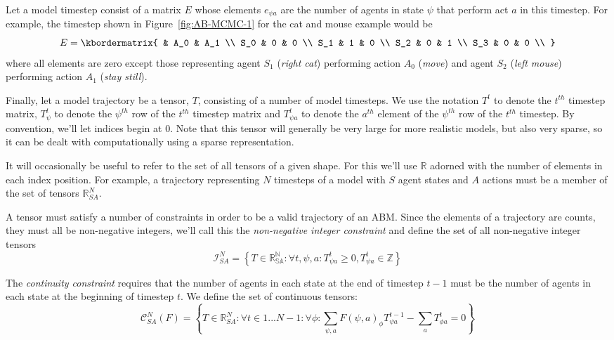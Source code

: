 \documentclass{article}
\begin{document}
Let a model timestep consist of a matrix $E$ whose elements $e_{\psi a}$ are the number of agents in state $\psi$ that perform act $a$ in this timestep. For example, the timestep shown in Figure~\ref{fig:AB-MCMC-1} for the cat and mouse example would be
\[
E = \kbordermatrix{
	& A_0 & A_1 \\
	S_0 & 0 & 0 \\
	S_1 & 1 & 0 \\
	S_2 & 0  & 1 \\
	S_3 & 0 & 0 \\
}
\]
where all elements are zero except those representing agent $S_1$ (\textit{right cat}) performing action $A_0$ (\textit{move}) and agent $S_2$ (\textit{left mouse}) performing action $A_1$ (\textit{stay still}).

Finally, let a model trajectory be a tensor, $T$, consisting of a number of model timesteps. We use the notation $T^t$ to denote the $t^{th}$ timestep matrix, $T^t_\psi$ to denote the $\psi^{th}$ row of the $t^{th}$ timestep matrix and $T^t_{\psi a}$ to denote the $a^{th}$ element of the $\psi^{th}$ row of the $t^{th}$ timestep. By convention, we'll let indices begin at 0. Note that this tensor will generally be very large for more realistic models, but also very sparse, so it can be dealt with computationally using a sparse representation.

It will occasionally be useful to refer to the set of all tensors of a given shape. For this we'll use $\mathbb{R}$ adorned with the number of elements in each index position. For example, a trajectory representing $N$ timesteps of a model with $S$ agent states and $A$ actions must be a member of the set of tensors $\mathbb{R}^N_{SA}$.

A tensor must satisfy a number of constraints in order to be a valid trajectory of an ABM. Since the elements of a trajectory are counts, they must all be non-negative integers, we'll call this the \textit{non-negative integer constraint} and define the set of all non-negative integer tensors
\begin{equation}
\mathcal{I}^N_{SA} = \left\{ T \in \mathbb{R^N_{SA}}: \forall t,\psi, a: T^t_{\psi a} \ge 0, T^t_{\psi a} \in \mathbb{Z}\right\}
\label{nonNegativeInt}
\end{equation}

The \textit{continuity constraint} requires that the number of agents in each state at the end of timestep $t-1$ must be the number of agents in each state at the beginning of timestep $t$.  We define the set of continuous tensors:
\begin{equation}
\mathcal{C}^N_{SA}(F) = \left\{T\in\mathbb{R}^N_{SA}:  \forall t \in 1 ... N-1:\forall \phi: \sum_{\psi, a} F(\psi, a)_\phi T^{t-1}_{\psi a} - \sum_a T^t_{\phi a} = 0\right\}
\label{continuous}
\end{equation}
\end{document}
